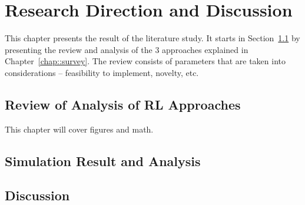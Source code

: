 \chapter{Research Direction and Discussion}
This chapter presents the result of the literature study. It starts in Section~\ref*{sec:review} by presenting the review and analysis of the 3 approaches explained in Chapter~\ref{chap::survey}. The review consists of parameters that are taken into considerations -- feasibility to implement, novelty, etc.
\section{Review of Analysis of \ac {RL} Approaches} \label{sec:review}
This chapter will cover figures and math. 

\section{Simulation Result and Analysis}

\section{Discussion}

